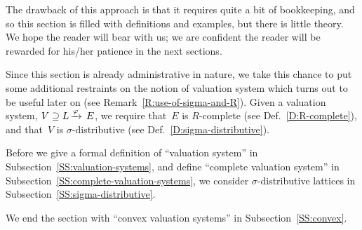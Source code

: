\documentclass[main.tex]{subfiles}
\begin{document}
The drawback of this approach is that it requires
quite a bit of bookkeeping,
and so this section
is filled with definitions and examples,
but there is little theory.
We hope the reader will bear with us;
we are confident the reader will be rewarded
for his/her patience
in the next sections.

Since this section
 is already  administrative in nature,
we take this chance
to put 
 some additional restraints on
the notion of valuation system
which turns out to be useful later on
(see Remark~\ref{R:use-of-sigma-and-R}).
Given a valuation system,
$V \supseteq L\,\smash{\xrightarrow{\varphi}\,E}$,
we  require that~$E$ is $R$-complete
(see Def.~\ref{D:R-complete}),
and that~$V$ is $\sigma$-distributive
(see Def.~\ref{D:sigma-distributive}).

Before we give a formal definition
of ``valuation system'' 
in Subsection~\ref{SS:valuation-systems},
and define ``complete valuation system''
in Subsection~\ref{SS:complete-valuation-systems},
we consider $\sigma$-distributive lattices
in Subsection~\ref{SS:sigma-distributive}.

We end the section
with ``convex valuation systems''
 in Subsection~\ref{SS:convex}.
%
%
\end{document}
